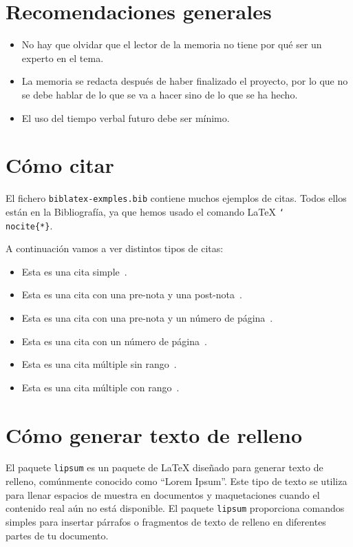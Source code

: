 \documentclass[a4paper,12pt]{report}
\begin{document}
\begin{appendices}

\chapter{Recomendaciones generales}

\begin{itemize}
\item No hay que olvidar que el lector de la memoria no tiene por qué ser un experto en el tema.
\item La memoria se redacta después de haber finalizado el proyecto, por lo que 
no se debe hablar de lo que se va a hacer sino de lo que se ha hecho.
\item El uso del tiempo verbal futuro debe ser mínimo.
\end{itemize}

\chapter{Cómo citar}

El fichero \texttt{biblatex-exmples.bib} contiene muchos ejemplos de citas. 
Todos ellos están en la Bibliografía, ya que hemos usado el comando \LaTeX{} \texttt{\char`\\nocite\{*\}}.

A continuación vamos a ver distintos tipos de citas:
\begin{itemize}
    \item Esta es una cita simple~\cite{westfahl:space}.
    \item Esta es una cita con una pre-nota y una post-nota~\cite[pre-nota][post-nota]{westfahl:space}.
    \item Esta es una cita con una pre-nota y un número de página~\cite[pre-nota][42]{westfahl:space}.
    \item Esta es una cita con un número de página~\cite[][42]{westfahl:space}.
    \item Esta es una cita múltiple sin rango~\cites{westfahl:space, aksin}.
    \item Esta es una cita múltiple con rango~\cites{westfahl:space, angenendt, aksin}.
\end{itemize} 

\chapter{Cómo generar texto de relleno}

El paquete \texttt{lipsum} es un paquete de LaTeX diseñado para generar texto de relleno, comúnmente conocido como ``Lorem Ipsum''.
Este tipo de texto se utiliza para llenar espacios de muestra en documentos y maquetaciones cuando el contenido real aún no está disponible. 
El paquete \texttt{lipsum} proporciona comandos simples para insertar párrafos o fragmentos de texto de relleno en diferentes partes de tu documento.


\end{appendices}
\end{document}
